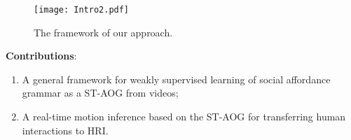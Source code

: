 \documentclass[letterpaper, 10 pt, conference]{ieeeconf}  %
\begin{document}


\begin{figure}[t!]
    \centering
    \texttt{[image: Intro2.pdf]}
    \vspace{-5pt}
    \caption{The framework of our approach.}
    \vspace{-10pt}
    \label{fig:intro}
\end{figure}


\textbf{Contributions}:
\vspace{-3pt}
\begin{enumerate}%
    \item A general framework for weakly supervised learning of social affordance grammar as a ST-AOG from videos;
    \item A real-time motion inference based on the ST-AOG for transferring human interactions to HRI.%
\end{enumerate}
\end{document}
